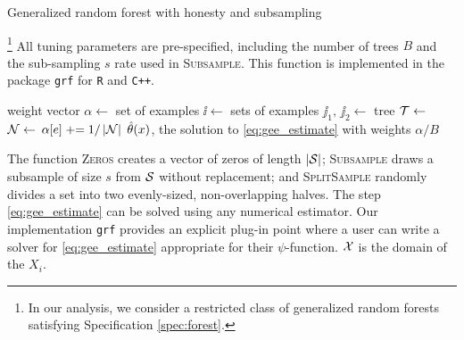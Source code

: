 \documentclass[aos]{imsart}
\theoremstyle{plain}
\theoremstyle{definition}
\theoremstyle{remark}
\begin{document}
\begin{CJK}{UTF8}{gbsn}
\begin{algorithm}[t]
\caption{Generalized random forest with honesty and subsampling }\label{alg:forest}
\vspace{-0.4\baselineskip}
\justify
\footnote{
In our analysis, we consider a restricted class of generalized random forests satisfying
Specification \ref{spec:forest}.} All tuning parameters are pre-specified, including the number of trees $B$ and the sub-sampling $s$ rate used in
\textsc{Subsample}. This function is implemented in the package \texttt{grf}
for \texttt{R} and \texttt{C++}.
\begin{algorithmic}[1]
\State weight vector $\alpha \gets$ 
\State set of examples $\ii \gets$ 
\State sets of examples $\jj_1, \, \jj_2 \gets$ 
\State tree $\mathcal{T} \gets$ 
\State $\mathcal{N} \gets $ 
\State $\alpha[{e}] \mathrel{+}= 1/\left\lvert\mathcal{N}\right\rvert$
\EndFor
\EndFor
{} $\hat{\theta}(x)$, the solution to \eqref{eq:gee_estimate} with weights $\alpha/B$
\EndProcedure
\end{algorithmic}
\justify
The function \textsc{Zeros} creates a vector of zeros of length $\left\lvert\mathcal{S}\right\rvert$;
\textsc{Subsample} draws a subsample of size $s$ from $\mathcal{S}$ without replacement; and
\textsc{SplitSample} randomly divides a set into two evenly-sized, non-overlapping halves.
The step \eqref{eq:gee_estimate} can be solved using any numerical estimator.
Our implementation \texttt{grf} provides an explicit plug-in point where a user can write
a solver for \eqref{eq:gee_estimate} appropriate for their $\psi$-function.
$\mathcal{X}$ is the domain of the $X_i$. 
\end{algorithm}


\newcommand{\qset}{\mathcal{Q}}


\end{CJK}
\end{document}
